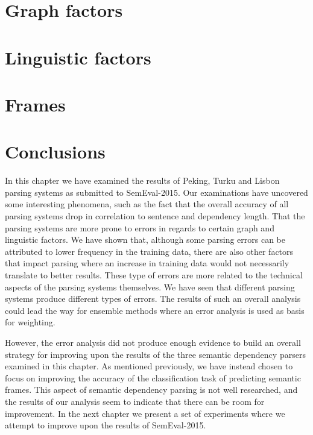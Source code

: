 
\section{Graph factors}

\section{Linguistic factors}

\section{Frames}

\section{Conclusions}

In this chapter we have examined the results of Peking, Turku and Lisbon parsing systems as submitted to SemEval-2015. Our examinations have uncovered some interesting phenomena, such as the fact that the overall accuracy of all parsing systems drop in correlation to sentence and dependency length. That the parsing systems are more prone to errors in regards to certain graph and linguistic factors. We have shown that, although some parsing errors can be attributed to lower frequency in the training data, there are also other factors that impact parsing where an increase in training data would not necessarily translate to better results. These type of errors are more related to the technical aspects of the parsing systems themselves. We have seen that different parsing systems produce different types of errors. The results of such an overall analysis could lead the way for ensemble methods where an error analysis is used as basis for weighting.

However, the error analysis did not produce enough evidence to build an overall strategy for improving upon the results of the three semantic dependency parsers examined in this chapter. As mentioned previously, we have instead chosen to focus on improving the accuracy of the classification task of predicting semantic frames. This aspect of semantic dependency parsing is not well researched, and the results of our analysis seem to indicate that there can be room for improvement. In the next chapter we present a set of experiments where we attempt to improve upon the results of SemEval-2015.

